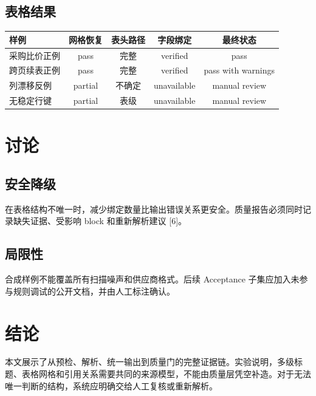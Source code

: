 \documentclass[10.5pt,a4paper]{article}
\begin{document}
\subsection{表格结果}
\begin{tabular}{p{40mm}c c c c}
\toprule
样例 & 网格恢复 & 表头路径 & 字段绑定 & 最终状态\\\midrule
采购比价正例 & pass & 完整 & verified & pass\\
跨页续表正例 & pass & 完整 & verified & pass with warnings\\
列漂移反例 & partial & 不确定 & unavailable & manual review\\
无稳定行键 & partial & 表级 & unavailable & manual review\\
\bottomrule
\end{tabular}
\section{讨论}
\subsection{安全降级}
在表格结构不唯一时，减少绑定数量比输出错误关系更安全。质量报告必须同时记录缺失证据、受影响 block 和重新解析建议 [6]。
\subsection{局限性}
合成样例不能覆盖所有扫描噪声和供应商格式。后续 Acceptance 子集应加入未参与规则调试的公开文档，并由人工标注确认。
\newpage
\section{结论}
本文展示了从预检、解析、统一输出到质量门的完整证据链。实验说明，多级标题、表格网格和引用关系需要共同的来源模型，不能由质量层凭空补造。对于无法唯一判断的结构，系统应明确交给人工复核或重新解析。
\end{document}
